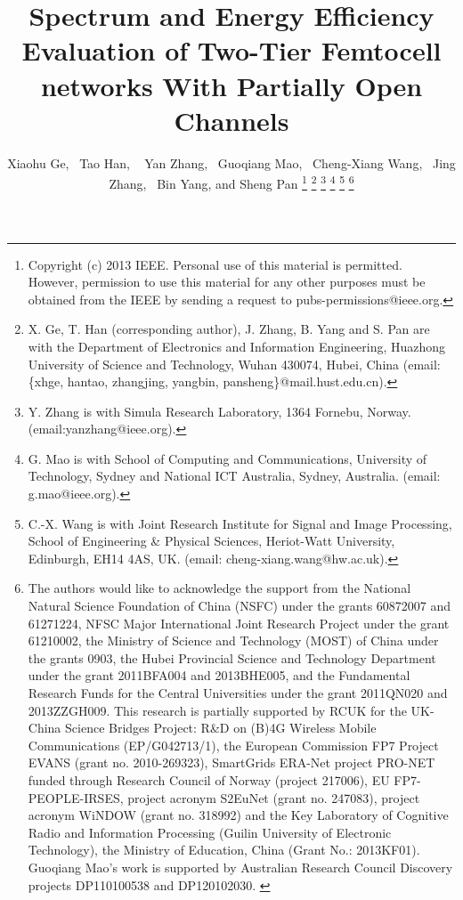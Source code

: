 \documentclass[10pt,final,journal,letterpaper,twoside,twocolumn]{IEEEtran}
\begin{document}
\title{Spectrum and Energy Efficiency Evaluation of Two-Tier Femtocell networks With Partially Open Channels}
\author{Xiaohu Ge,~
        Tao Han, ~
        Yan Zhang,~
        Guoqiang Mao,~
        Cheng-Xiang Wang,~
        Jing Zhang,~
        Bin Yang,
        and Sheng Pan
\thanks{\scriptsize{Copyright (c) 2013 IEEE. Personal use of this material is permitted. However, permission to use this material for any other purposes must be obtained from the IEEE by sending a request to pubs-permissions@ieee.org.}}
\thanks{\scriptsize{X. Ge, T. Han (corresponding author), J. Zhang, B. Yang and S. Pan are with the Department of Electronics and Information Engineering, Huazhong University of Science and Technology, Wuhan 430074, Hubei, China (email: \{xhge, hantao, zhangjing, yangbin, pansheng\}@mail.hust.edu.cn).}}
\thanks{\scriptsize{Y. Zhang is with Simula Research Laboratory, 1364 Fornebu, Norway. (email:yanzhang@ieee.org).}}
\thanks{\scriptsize{G. Mao is with School of Computing and Communications,
University of Technology, Sydney and National ICT Australia, Sydney, Australia. (email: g.mao@ieee.org).}}
\thanks{\scriptsize{C.-X. Wang is with Joint Research Institute for Signal and Image Processing, School of Engineering \& Physical Sciences, Heriot-Watt University, Edinburgh, EH14 4AS, UK. (email: cheng-xiang.wang@hw.ac.uk).}}
\thanks{\scriptsize{The authors would like to acknowledge the support from the National Natural Science Foundation of China (NSFC) under the grants 60872007 and 61271224, NFSC Major International Joint Research Project under the grant 61210002, the Ministry of Science and Technology (MOST) of China under the grants 0903, the Hubei Provincial Science and Technology Department under the grant 2011BFA004 and 2013BHE005, and the Fundamental Research Funds for the Central Universities under the grant 2011QN020 and 2013ZZGH009. This research is partially supported by RCUK for the UK-China Science Bridges Project: R\&D on (B)4G Wireless Mobile Communications (EP/G042713/1), the European Commission FP7 Project EVANS (grant no. 2010-269323), SmartGrids ERA-Net project PRO-NET funded through Research Council of Norway (project 217006), EU FP7-PEOPLE-IRSES, project acronym S2EuNet (grant no. 247083), project acronym WiNDOW (grant no. 318992) and the Key Laboratory of Cognitive Radio and Information Processing (Guilin University of Electronic Technology), the Ministry of Education, China (Grant No.: 2013KF01). Guoqiang Mao's work is supported by Australian Research Council Discovery projects DP110100538 and DP120102030.
}}
}
\maketitle
\end{document}
